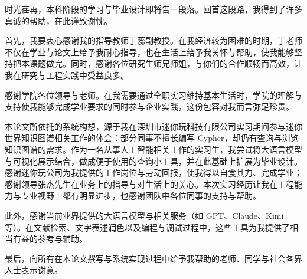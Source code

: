 \documentclass[12pt,a4paper]{article}
\begin{document}
\begin{thesisacknowledgement}

    时光荏苒，本科阶段的学习与毕业设计即将告一段落。回首这段路，我得到了许多真诚的帮助，在此谨致谢忱。
    
    首先，我要衷心感谢我的指导教师丁蕊副教授。在我经济较为困难的时期，丁老师不仅在学业与论文上给予我耐心指导，也在生活上给予我关怀与帮助，使我能够坚持把本课题做完。同时，感谢各位研究生师兄师姐，与你们的合作顺畅而高效，让我在研究与工程实践中受益良多。
    
    感谢学院各位领导与老师。在我需要通过全职实习维持基本生活时，学院的理解与支持使我能够完成学业要求的同时参与企业实践，这份包容对我而言弥足珍贵。
    
    本论文所依托的系统构想，源于我在深圳市迷你玩科技有限公司实习期间参与迷你世界知识图谱相关工作的体会：部分同事不擅长编写 Cypher，却仍有查询与浏览知识图谱的需求。作为一名从事人工智能相关工作的实习生，我尝试将大语言模型与可视化展示结合，做成便于使用的查询小工具，并在此基础上扩展为毕业设计。感谢迷你玩公司为我提供的工作岗位与劳动回报，使我得以自食其力、完成学业；感谢领导张杰先生在业务上的指导与对生活上的关心。本次实习经历让我在工程能力与专业视野上都有明显进步，也感谢团队中各位同事的支持与帮助。
    
    此外，感谢当前业界提供的大语言模型与相关服务（如 GPT、Claude、Kimi 等）。在文献检索、文字表述润色以及编程与调试过程中，这些工具为我提供了相当有益的参考与辅助。
    
    最后，向所有在本论文撰写与系统实现过程中给予我帮助的老师、同学与社会各界人士表示谢意。
    
    \end{thesisacknowledgement}
\end{document}
